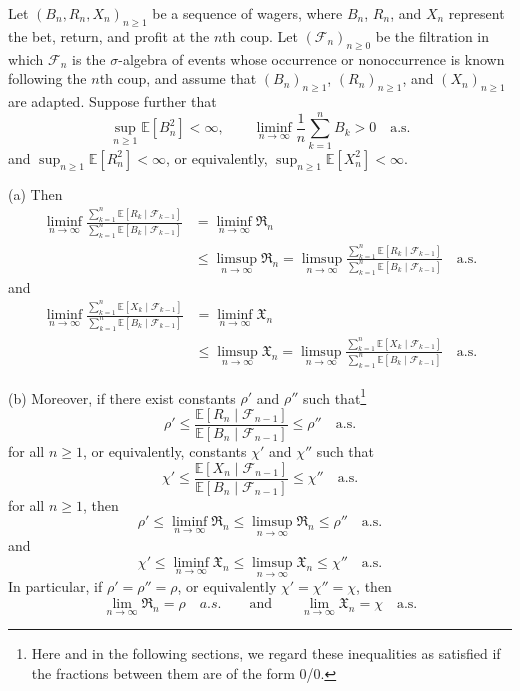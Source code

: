\documentclass[10pt,a4paper]{amsart}
\newcommand{\E}{\mathbb{E}}
\newcommand{\F}{\mathscr{F}}
\begin{document}
\begin{theorem}\label{theorem:main}
Let $(B_n,R_n,X_n)_{n\ge1}$ be a sequence of wagers, where $B_n$, $R_n$, and $X_n$ represent the bet, return, and profit at the $n$th coup.  Let $(\F_n)_{n\ge 0}$ be the filtration in which $\F_n$ is the $\sigma$-algebra of events whose occurrence or nonoccurrence is known following the $n$th coup, and assume that $(B_n)_{n\ge1}$, $(R_n)_{n\ge1}$, and $(X_n)_{n\ge1}$ are adapted.  Suppose further that
\[
\sup_{n\ge1}\E[B_n^2]< \infty, \qquad
\liminf_{n\to\infty}\frac{1}{n}\sum_{k=1}^n B_k>0\quad\text{a.s.}
\]
and $\sup_{n\ge1}\E[R_n^2]<\infty$, or equivalently, $\sup_{n\ge1}\E[X_n^2]<\infty$.

(a) Then 
\begin{align*}
\liminf_{n\to\infty}\frac{\sum_{k=1}^n \E[R_k\mid\F_{k-1}]}{\sum_{k=1}^n \E[B_k\mid\F_{k-1}]}
&=\liminf_{n\to\infty} \mathfrak{R}_n \\
&\le\limsup_{n\to\infty} \mathfrak{R}_n
=\limsup_{n\to\infty}\frac{\sum_{k=1}^n \E[R_k\mid\F_{k-1}]}{\sum_{k=1}^n \E[B_k\mid\F_{k-1}]}
\quad\text{a.s.}
\end{align*}
and 
\begin{align*}
\liminf_{n\to\infty}\frac{\sum_{k=1}^n \E[X_k\mid\F_{k-1}]}{\sum_{k=1}^n \E[B_k\mid\F_{k-1}]}
&=\liminf_{n\to\infty} \mathfrak{X}_n \\
&\le\limsup_{n\to\infty} \mathfrak{X}_n
=\limsup_{n\to\infty}\frac{\sum_{k=1}^n \E[X_k\mid\F_{k-1}]}{\sum_{k=1}^n \E[B_k\mid\F_{k-1}]}
\quad\text{a.s.}
\end{align*}

(b) Moreover, if there exist constants $\rho'$ and $\rho''$ such that\footnote{\label{note1}Here and in the following sections, we regard these inequalities as satisfied if the fractions between them are of the form 0/0.}
\[
    \rho'
    \le \frac{\E[R_n \mid \F_{n-1}]}{\E[B_n \mid \F_{n-1}]}
    \le \rho'' \quad \text{a.s.}
\]
for all $n\ge1$, or equivalently, constants $\chi'$ and $\chi''$ such that 
\[
    \chi'
    \le \frac{\E[X_n \mid \F_{n-1}]}{\E[B_n \mid \F_{n-1}]}
    \le \chi'' \quad \text{a.s.}
\]
for all $n\ge1$, then
\[    \rho' \le \liminf_{n\to\infty}\mathfrak{R}_n
    \le \limsup_{n\to\infty}\mathfrak{R}_n
    \le \rho''\quad \text{a.s.}
\]
and
\[
    \chi' \le \liminf_{n\to\infty}\mathfrak{X}_n
    \le \limsup_{n\to\infty}\mathfrak{X}_n
    \le \chi''
    \quad \text{a.s.}
\]
In particular, if $\rho'=\rho''=\rho$, or equivalently $\chi'=\chi''=\chi$, then 
\[
\lim_{n\to\infty}\mathfrak{R}_n = \rho\quad a.s.\qquad \text{and} \qquad \lim_{n\to\infty}\mathfrak{X}_n = \chi \quad \text{a.s.}
\]
\end{theorem}
\end{document}
